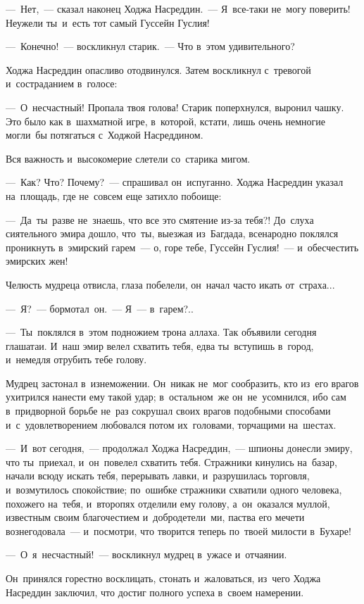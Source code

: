 \documentclass[12pt,a4paper]{book}
\begin{document}
—~Нет,~— сказал наконец Ходжа Насреддин.~— Я~все-таки не~могу поверить! Неужели ты~и~есть тот самый Гуссейн Гуслия!

—~Конечно!~— воскликнул старик.~— Что в~этом удивительного?

Ходжа Насреддин опасливо отодвинулся. Затем воскликнул с~тревогой и~состраданием в~голосе:

—~О~несчастный! Пропала твоя голова! Старик поперхнулся, выронил чашку. Это было как в~шахматной игре, в~которой, кстати, лишь очень немногие могли~бы потягаться с~Ходжой Насреддином.

Вся важность и~высокомерие слетели со~старика мигом.

—~Как? Что? Почему?~— спрашивал он~испуганно. Ходжа Насреддин указал на~площадь, где не~совсем еще затихло побоище:

—~Да~ты~разве не~знаешь, что все это смятение из-за тебя?! До~слуха сиятельного эмира дошло, что~ты, выезжая из~Багдада, всенародно поклялся проникнуть в~эмирский гарем~— о, горе тебе, Гуссейн Гуслия!~— и~обесчестить эмирских жен!

Челюсть мудреца отвисла, глаза побелели, он~начал часто икать от~страха...

—~Я?~— бормотал~он.~— Я~— в~гарем?..

—~Ты~поклялся в~этом подножием трона аллаха. Так объявили сегодня глашатаи. И~наш эмир велел схватить тебя, едва ты~вступишь в~город, и~немедля отрубить тебе голову.

Мудрец застонал в~изнеможении. Он~никак не~мог сообразить, кто из~его врагов ухитрился нанести ему такой удар; в~остальном~же он~не~усомнился, ибо сам в~придворной борьбе не~раз сокрушал своих врагов подобными способами и~с~удовлетворением любовался потом их~головами, торчащими на~шестах.

—~И~вот сегодня,~— продолжал Ходжа Насреддин,~— шпионы донесли эмиру, что ты~приехал, и~он~повелел схватить тебя. Стражники кинулись на~базар, начали всюду искать тебя, перерывать лавки, и~разрушилась торговля, и~возмутилось спокойствие; по~ошибке стражники схватили одного человека, похожего на~тебя, и~второпях отделили ему голову, а~он~оказался муллой, известным своим благочестием и~добродетели~ми, паства его мечети вознегодовала~— и~посмотри, что творится теперь по~твоей милости в~Бухаре!

—~О~я~несчастный!~— воскликнул мудрец в~ужасе и~отчаянии.

Он~принялся горестно восклицать, стонать и~жаловаться, из~чего Ходжа Насреддин заключил, что достиг полного успеха в~своем намерении.
\end{document}
